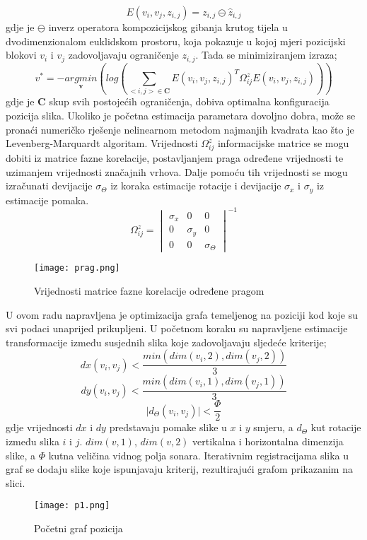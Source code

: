 \documentclass[times, utf8, diplomski]{fer}
\begin{document}
$$ E(v_i,v_j,z_{i,j})= z_{i,j} \ominus \hat{z}_{i,j}$$
gdje je $\ominus$ inverz operatora kompozicijskog gibanja krutog tijela u dvodimenzionalom euklidskom prostoru, koja pokazuje u kojoj mjeri pozicijski blokovi  $v_i$ i $v_j$ zadovoljavaju ograničenje $z_{i,j}$. Tada se minimiziranjem izraza;
$$ v^* = -\underset{\textbf{v}}{argmin}(log(\sum_{<i,j> \in \textbf{C}}E(v_i,v_j,z_{i,j})^T \Omega_{ij}^z E(v_i,v_j,z_{i,j})))$$
gdje je $\textbf{C}$ skup svih postojećih ograničenja, dobiva optimalna konfiguracija pozicija slika. Ukoliko je početna estimacija parametara dovoljno dobra, može se pronaći numeričko rješenje nelinearnom metodom najmanjih kvadrata kao što je Levenberg-Marquardt algoritam. Vrijednosti $\Omega_{ij}^z$ informacijske matrice se mogu dobiti iz matrice fazne korelacije, postavljanjem praga određene vrijednosti te uzimanjem vrijednosti značajnih vrhova. Dalje pomoću tih vrijednosti se mogu izračunati devijacije $\sigma_{\Theta}$ iz koraka estimacije rotacije i devijacije $\sigma_x$ i $\sigma_y$ iz estimacije pomaka.
$$ \Omega_{ij}^z = \begin{vmatrix}
\sigma_x & 0& 0\\
0 & \sigma_y & 0 \\
0 & 0 & \sigma_{\Theta}
\end{vmatrix}^{-1}$$ 
\begin{figure}[!tbh]
\centering
\texttt{[image: prag.png]}
		\caption{ Vrijednosti matrice fazne korelacije određene pragom }
		\label{fig:Graf pozicija}
\end{figure}
\newpage
U ovom radu napravljena je optimizacija grafa temeljenog na poziciji kod koje su svi podaci unaprijed prikupljeni. U početnom koraku su napravljene estimacije transformacije između susjednih slika koje zadovoljavaju sljedeće kriterije;
$$ dx(v_i,v_j) < \frac{min(dim(v_i,2),dim(v_j,2))}{3} $$
$$ dy(v_i,v_j) < \frac{min(dim(v_i,1),dim(v_j,1))}{3} $$
$$ \mid d_{\Theta}(v_i,v_j) \mid < \frac{\Phi}{2}   $$
gdje vrijednosti $dx$ i $dy$ predstavaju pomake slike u $x$ i $y$ smjeru, a $d_{\Theta}$ kut rotacije između slika $i$ i $j$. $dim(v,1)$, $dim(v,2)$ vertikalna i horizontalna dimenzija slike, a $\Phi$ kutna veličina vidnog polja sonara.
Iterativnim registracijama slika u graf se dodaju slike koje ispunjavaju kriterij, rezultirajući grafom prikazanim na slici.
\begin{figure}[!tbh]
\centering
\texttt{[image: p1.png]}
		\caption{ Početni graf pozicija}
		\label{fig:Graf pozicija}
\end{figure}
\\
\end{document}
